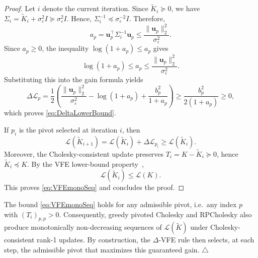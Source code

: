 \documentclass[onefignum,onetabnum]{siamart250211}
\begin{document}
\begin{proof}
    Let $i$ denote the current iteration. Since $\widetilde K_i\succeq 0$, we have $\Sigma_i=\widetilde K_i+\sigma_\varepsilon^2 I \succeq \sigma_\varepsilon^2 I.$
    Hence, $\Sigma_i^{-1}\preceq \sigma_\varepsilon^{-2}I.$
    Therefore,
    \begin{equation*}
        a_p
        =
        \bm u_p^\top\Sigma_i^{-1}\bm u_p
        \le
        \frac{\|\bm u_p\|_2^2}{\sigma_\varepsilon^2}.
    \end{equation*}
    Since $a_p\ge 0$, the inequality $\log(1+a_p)\le a_p$ gives
    \begin{equation*}
        \log(1+a_p)
        \le
        a_p
        \le
        \frac{\|\bm u_p\|_2^2}{\sigma_\varepsilon^2}.
    \end{equation*}
    Substituting this into the gain formula yields
    \begin{equation*}
        \Delta\mathcal{L}_p
        =
        \frac12
        \left(
        \frac{\|\bm u_p\|_2^2}{\sigma_\varepsilon^2}
        -
        \log(1+a_p)
        +
        \frac{b_p^2}{1+a_p}
        \right)
        \ge
        \frac{b_p^2}{2(1+a_p)}
        \ge
        0,
    \end{equation*}
    which proves \eqref{eq:DeltaLowerBound}.
    
    If $p_i$ is the pivot selected at iteration $i$, then
    \begin{equation*}
        \mathcal L(\widetilde K_{i+1})
        =
        \mathcal L(\widetilde K_i)
        +
        \Delta\mathcal L_{p_i}
        \ge
        \mathcal L(\widetilde K_i).
    \end{equation*}
    Moreover, the Cholesky-consistent update preserves
    $T_i=K-\widetilde K_i\succeq0$, hence $\widetilde K_i\preceq K$.
    By the VFE lower-bound property~\cite{Titsias.2009},
    \begin{equation*}
        \mathcal L(\widetilde K_i)\le \mathcal L(K).
    \end{equation*}
    This proves \eqref{eq:VFEmonoSeq} and concludes the proof.
\end{proof}
\begin{remark}
    The bound \eqref{eq:VFEmonoSeq} holds for any admissible pivot, i.e.~any index $p$ with $(T_i)_{p,p} > 0$. Consequently, greedy pivoted Cholesky and RPCholesky also produce monotonically non-decreasing sequences of $\mathcal{L}(\widetilde{K})$ under Cholesky-consistent rank-1 updates. By construction, the $\Delta$-VFE rule then selects, at each step, the admissible pivot that maximizes this guaranteed gain. \hfill$\triangle$
\end{remark}
\end{document}
